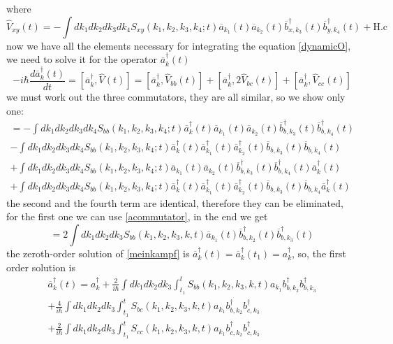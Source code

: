 where 
\begin{equation}\hat{V}_{xy}(t) = -\int dk_1dk_2dk_3dk_4S_{xy}(k_1,k_2,k_3,k_4;t)\overline{a}_{k_1}(t)\overline{a}_{k_2}(t)\overline{b}_{x,k_3}^\dagger(t) \overline{b}_{y,k_4}^\dagger(t) +\text{H.c}\end{equation}
now we have all the elements necessary for integrating the equation \eqref{dynamicO}, we need to solve it for the operator $\overline{a}^\dagger_{k}(t)$
\begin{equation}\label{meinkampf}-i\hbar \frac{d\overline{a}^\dagger_{k}(t)}{dt} = [\overline{a}^\dagger_{k},\hat{V}(t)] = [\overline{a}^\dagger_{k},\hat{V}_{bb}(t)] + [\overline{a}^\dagger_{k},2\hat{V}_{bc}(t)] +[\overline{a}^\dagger_{k},\hat{V}_{cc}(t)]\end{equation}
we must work out the three commutators, they are all similar, so we show only one:
\begin{multline}[\overline{a}^\dagger_{k},\hat{V}_{bb}(t)] = -\int dk_1dk_2dk_3dk_4S_{bb}(k_1,k_2,k_3,k_4;t)\overline{a}^\dagger_{k}(t)\overline{a}_{k_1}(t)\overline{a}_{k_2}(t)\overline{b}_{b,k_3}^\dagger(t) \overline{b}_{b,k_4}^\dagger(t) \\
-\int dk_1dk_2dk_3dk_4S_{bb}(k_1,k_2,k_3,k_4;t)\overline{a}^\dagger_{k}(t)\overline{a}^\dagger_{k_1}(t)\overline{a}^\dagger_{k_2}(t)\overline{b}_{b,k_3}(t) \overline{b}_{b,k_4}(t) \\
+ \int dk_1dk_2dk_3dk_4S_{bb}(k_1,k_2,k_3,k_4;t)\overline{a}_{k_1}(t)\overline{a}_{k_2}(t)\overline{b}_{b,k_3}^\dagger(t) \overline{b}_{b,k_4}^\dagger(t)\overline{a}^\dagger_{k}(t)\\ 
+ \int dk_1dk_2dk_3dk_4S_{bb}(k_1,k_2,k_3,k{}_4;t)\overline{a}^\dagger_{k}(t)\overline{a}^\dagger_{k_1}(t)\overline{a}^\dagger_{k_2}(t)\overline{b}_{b,k_3}(t) \overline{b}_{b,k_4}\overline{a}^\dagger_{k}(t) \end{multline}
the second and the fourth term are identical, therefore they can be eliminated, for the first one we can use \eqref{acommutator}, in the end we get
\begin{equation}[\overline{a}^\dagger_{k},\hat{V}_{bb}(t)] = 2\int dk_1 dk_2 dk_3 S_{bb}(k_1,k_2,k_3,k,t)\overline{a}_{k_1}(t)\overline{b}_{b,k_2}^\dagger(t)\overline{b}_{b,k_3}^\dagger(t)\end{equation}
the zeroth-order solution of \eqref{meinkampf} is $\overline{a}^\dagger_{k}(t) = \overline{a}^\dagger_{k}(t_1) = a_k^\dagger$, so, the first order solution is
\begin{multline}\label{abarra}\overline{a}^\dagger_{k}(t) = a_k^\dagger + \frac{2}{i\hbar}\int dk_1dk_2 dk_3 \int_{t_1}^tS_{bb}(k_1,k_2,k_3,k,t)a_{k_1}b_{b,k_2}^\dagger b_{b,k_3}^\dagger \\+\frac{4}{i\hbar}\int dk_1dk_2 dk_3 \int_{t_1}^tS_{bc}(k_1,k_2,k_3,k,t)a_{k_1}b_{b,k_2}^\dagger b_{c,k_3}^\dagger \\
+ \frac{2}{i\hbar}\int dk_1dk_2 dk_3 \int_{t_1}^tS_{cc}(k_1,k_2,k_3,k,t)a_{k_1}b_{c,k_2}^\dagger b_{c,k_3}^\dagger \end{multline}
